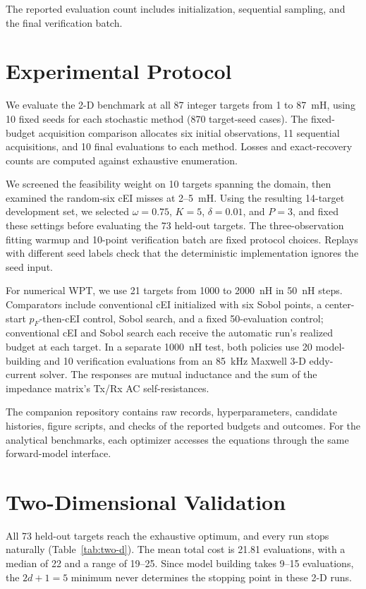 \documentclass[10pt,conference,letterpaper]{IEEEtran}
\begin{document}
The reported evaluation count includes initialization, sequential sampling, and the final verification batch.

\section{Experimental Protocol}
We evaluate the 2-D benchmark at all 87 integer targets from 1 to 87~mH, using 10 fixed seeds for each stochastic method (870 target-seed cases). The fixed-budget acquisition comparison allocates six initial observations, 11 sequential acquisitions, and 10 final evaluations to each method. Losses and exact-recovery counts are computed against exhaustive enumeration.

We screened the feasibility weight on 10 targets spanning the domain, then examined the random-six cEI misses at 2--5~mH. Using the resulting 14-target development set, we selected $\omega=0.75$, $K=5$, $\delta=0.01$, and $P=3$, and fixed these settings before evaluating the 73 held-out targets. The three-observation fitting warmup and 10-point verification batch are fixed protocol choices. Replays with different seed labels check that the deterministic implementation ignores the seed input.

For numerical WPT, we use 21 targets from 1000 to 2000~nH in 50~nH steps. Comparators include conventional cEI initialized with six Sobol points, a center-start $p_F$-then-cEI control, Sobol search, and a fixed 50-evaluation control; conventional cEI and Sobol search each receive the automatic run's realized budget at each target. In a separate 1000~nH test, both policies use 20 model-building and 10 verification evaluations from an 85~kHz Maxwell 3-D eddy-current solver. The responses are mutual inductance and the sum of the impedance matrix's Tx/Rx AC self-resistances.

The companion repository contains raw records, hyperparameters, candidate histories, figure scripts, and checks of the reported budgets and outcomes. For the analytical benchmarks, each optimizer accesses the equations through the same forward-model interface.

\section{Two-Dimensional Validation}
All 73 held-out targets reach the exhaustive optimum, and every run stops naturally (Table~\ref{tab:two-d}). The mean total cost is 21.81 evaluations, with a median of 22 and a range of 19--25. Since model building takes 9--15 evaluations, the $2d+1=5$ minimum never determines the stopping point in these 2-D runs.
\end{document}

